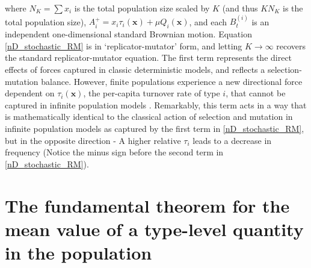 where $N_K = \sum x_i$ is the total population size scaled by $K$ (and thus $KN_K$ is the total population size), $A_i^{+} = x_i\tau_i(\mathbf{x}) + \mu Q_i(\mathbf{x})$, and each $B^{(i)}_t$ is an independent one-dimensional standard Brownian motion. Equation \eqref{nD_stochastic_RM} is in `replicator-mutator' form, and letting $K \to \infty$ recovers the standard replicator-mutator equation. The first term represents the direct effects of forces captured in classic deterministic models, and reflects a selection-mutation balance. However, finite populations experience a new directional force dependent on $\tau_i(\mathbf{x})$, the per-capita turnover rate of type $i$, that cannot be captured in infinite population models \citep{kuosmanen_turnover_2022}. Remarkably, this term acts in a way that is mathematically identical to the classical action of selection and mutation in infinite population models as captured by the first term in \eqref{nD_stochastic_RM}, but in the opposite direction - A higher relative $\tau_i$ leads to a decrease in frequency (Notice the minus sign before the second term in \eqref{nD_stochastic_RM}).
\section{The fundamental theorem for the mean value of a type-level quantity in the population}\label{sec_fun_theorems_mean}

